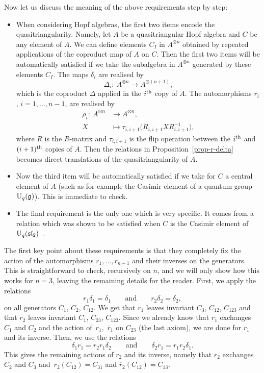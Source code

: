\documentclass[pdftex]{sigma}
\numberwithin{equation}{section}
\theoremstyle{definition}
\newcommand{\rb}{\overline{r}}
\begin{document}
Now let us discuss the meaning of the above requirements step by step:
\begin{itemize}\itemsep=0pt
\item When considering Hopf algebras, the first two items encode the quasitriangularity. Namely, let $A$ be a quasitriangular Hopf algebra and $C$ be any element of $A$. We can define elements $C_I$ in $A^{\otimes n}$ obtained by repeated applications of the coproduct map of $A$ on $C$. Then the first two items will be automatically satisfied if we take the subalgebra in $A^{\otimes n}$ generated by these elements $C_I$. The maps $\delta_i$ are realised by
\begin{equation*}
\Delta_i\colon \ A^{\otimes n} \to A^{\otimes (n+1)},
\end{equation*}
which is the coproduct $\Delta$ applied in the $i^{\rm th}$ copy of $A$. The automorphisms $r_i$, $i=1,\dots,n-1$, are realised by
\begin{align*}
\rho_i\colon \ A^{\otimes n} &\to A^{\otimes n},\\
 X & \mapsto \tau_{i,i+1}\big( R_{i,i+1} X R_{i,i+1}^{-1}\big),
\end{align*}
where $R$ is the $R$-matrix and $\tau_{i,i+1}$ is the flip operation between the $i^{\rm th}$ and $(i+1)^{\rm th}$ copies of $A$. Then the relations in Proposition~\ref{prop-r-delta} becomes direct translations of the quasitriangularity of $A$.

\item Now the third item will be automatically satisfied if we take for $C$ a central element of $A$ (such as for example the Casimir element of a quantum group ${\rm U}_q(\mathfrak{g})$). This is immediate to check.

\item The final requirement is the only one which is very specific. It comes from a relation which was shown to be satisfied when $C$ is the Casimir element of ${\rm U}_q(\mathfrak{sl}_2)$~\cite{CGVZ}.
\end{itemize}

The first key point about these requirements is that they completely fix the action of the automorphisms $r_1,\dots,r_{n-1}$ and their inverses on the generators. This is straightforward to check, recursively on $n$, and we will only show how this works for $n=3$, leaving the remaining details for the reader. First, we apply the relations
\[
r_1\delta_1=\delta_1\qquad \text{and}\qquad r_2\delta_2=\delta_2 ,
\]
on all generators $C_1$, $C_2$, $C_{12}$. We get that $r_1$ leaves invariant $C_{3}$, $C_{12}$, $C_{123}$ and that $r_2$ leaves invariant $C_1$, $C_{23}$, $C_{123}$. Since we already know that $r_1$ exchanges $C_1$ and $C_2$ and the action of~$r_1$,~$\rb_1$ on $C_{23}$ (the last axiom), we are done for $r_1$ and its inverse. Then, we use the relations
\[
\delta_1r_1=r_2r_1\delta_2\qquad \text{and}\qquad \delta_2 r_1=r_1r_2\delta_1 .
\]
This gives the remaining actions of $r_2$ and its inverse, namely that $r_2$ exchanges $C_2$ and $C_3$ and~$r_2(C_{12})=C_{31}$ and $\rb_2(C_{12})=C_{13}$.
\end{document}
